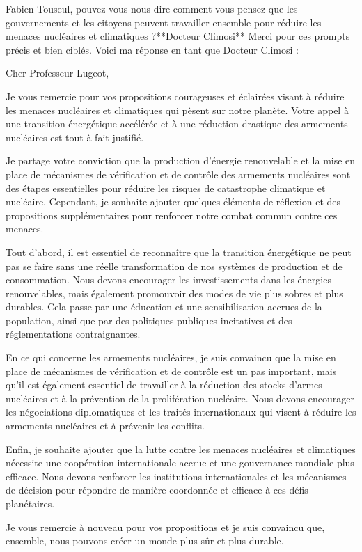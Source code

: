 Fabien Touseul, pouvez-vous nous dire comment vous pensez que les gouvernements et les citoyens peuvent travailler ensemble pour réduire les menaces nucléaires et climatiques ?**Docteur Climosi**
Merci pour ces prompts précis et bien ciblés. Voici ma réponse en tant que Docteur Climosi :

Cher Professeur Lugeot,

Je vous remercie pour vos propositions courageuses et éclairées visant à réduire les menaces nucléaires et climatiques qui pèsent sur notre planète. Votre appel à une transition énergétique accélérée et à une réduction drastique des armements nucléaires est tout à fait justifié.

Je partage votre conviction que la production d'énergie renouvelable et la mise en place de mécanismes de vérification et de contrôle des armements nucléaires sont des étapes essentielles pour réduire les risques de catastrophe climatique et nucléaire. Cependant, je souhaite ajouter quelques éléments de réflexion et des propositions supplémentaires pour renforcer notre combat commun contre ces menaces.

Tout d'abord, il est essentiel de reconnaître que la transition énergétique ne peut pas se faire sans une réelle transformation de nos systèmes de production et de consommation. Nous devons encourager les investissements dans les énergies renouvelables, mais également promouvoir des modes de vie plus sobres et plus durables. Cela passe par une éducation et une sensibilisation accrues de la population, ainsi que par des politiques publiques incitatives et des réglementations contraignantes.

En ce qui concerne les armements nucléaires, je suis convaincu que la mise en place de mécanismes de vérification et de contrôle est un pas important, mais qu'il est également essentiel de travailler à la réduction des stocks d'armes nucléaires et à la prévention de la prolifération nucléaire. Nous devons encourager les négociations diplomatiques et les traités internationaux qui visent à réduire les armements nucléaires et à prévenir les conflits.

Enfin, je souhaite ajouter que la lutte contre les menaces nucléaires et climatiques nécessite une coopération internationale accrue et une gouvernance mondiale plus efficace. Nous devons renforcer les institutions internationales et les mécanismes de décision pour répondre de manière coordonnée et efficace à ces défis planétaires.

Je vous remercie à nouveau pour vos propositions et je suis convaincu que, ensemble, nous pouvons créer un monde plus sûr et plus durable.

